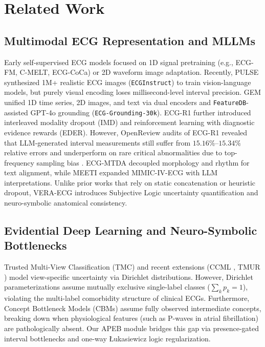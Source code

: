 \documentclass[preprint,12pt]{elsarticle}
\begin{document}
\section{Related Work}
\subsection{Multimodal ECG Representation and MLLMs}
Early self-supervised ECG models focused on 1D signal pretraining (e.g., ECG-FM, C-MELT, ECG-CoCa) or 2D waveform image adaptation. Recently, PULSE \cite{pulse2026} synthesized 1M+ realistic ECG images (\texttt{ECGInstruct}) to train vision-language models, but purely visual encoding loses millisecond-level interval precision. GEM \cite{gem2025} unified 1D time series, 2D images, and text via dual encoders and \texttt{FeatureDB}-assisted GPT-4o grounding (\texttt{ECG-Grounding-30k}). ECG-R1 \cite{ecgr1_2026} further introduced interleaved modality dropout (IMD) and reinforcement learning with diagnostic evidence rewards (EDER). However, OpenReview audits of ECG-R1 revealed that LLM-generated interval measurements still suffer from $15.16\%\text{--}15.34\%$ relative errors and underperform on rare critical abnormalities due to top-frequency sampling bias \cite{ecgr1_2026}. ECG-MTDA \cite{ecgmtda2026} decoupled morphology and rhythm for text alignment, while MEETI \cite{meeti2026} expanded MIMIC-IV-ECG with LLM interpretations. Unlike prior works that rely on static concatenation or heuristic dropout, VERA-ECG introduces Subjective Logic uncertainty quantification and neuro-symbolic anatomical consistency.

\subsection{Evidential Deep Learning and Neuro-Symbolic Bottlenecks}
Trusted Multi-View Classification (TMC) \cite{tmc2023} and recent extensions (CCML \cite{ccml2025}, TMUR \cite{tmur2026}) model view-specific uncertainty via Dirichlet distributions. However, Dirichlet parameterizations assume mutually exclusive single-label classes ($\sum_k p_k = 1$), violating the multi-label comorbidity structure of clinical ECGs. Furthermore, Concept Bottleneck Models (CBMs) assume fully observed intermediate concepts, breaking down when physiological features (such as P-waves in atrial fibrillation) are pathologically absent. Our APEB module bridges this gap via presence-gated interval bottlenecks and one-way \L{}ukasiewicz logic regularization.
\end{document}
